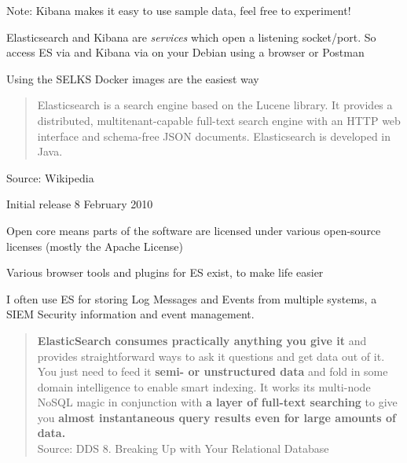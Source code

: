\documentclass[Screen16to9,17pt]{foils}
\begin{document}


Note: Kibana makes it easy to use sample data, feel free to experiment!

Elasticsearch and Kibana are \emph{services} which open a listening socket/port. So access ES via  and Kibana via  on your Debian using a browser or Postman

Using the SELKS Docker images are the easiest way



\begin{quote}
Elasticsearch is a search engine based on the Lucene library. It provides a distributed, multitenant-capable full-text search engine with an HTTP web interface and schema-free JSON documents. Elasticsearch is developed in Java.
\end{quote}

Source: Wikipedia 

\begin{list2}
\item Initial release	8 February 2010
\item Open core means parts of the software are licensed under various open-source licenses (mostly the Apache License)
\item Various browser tools and plugins for ES exist, to make life easier
\item I often use ES for storing Log Messages and Events from multiple systems, a SIEM Security information and event management.
\end{list2}




\begin{quote}\small
{\bf ElasticSearch consumes practically anything you give it} and provides straightforward ways to ask it questions and get data out of it. You just need to feed it {\bf semi- or unstructured data} and fold in some domain intelligence to enable smart indexing. It works its multi-node NoSQL magic in conjunction with {\bf a layer of full-text searching} to give you {\bf almost instantaneous query results even for large amounts of data.}\\
Source: DDS 8. Breaking Up with Your Relational Database
\end{quote}
\end{document}
